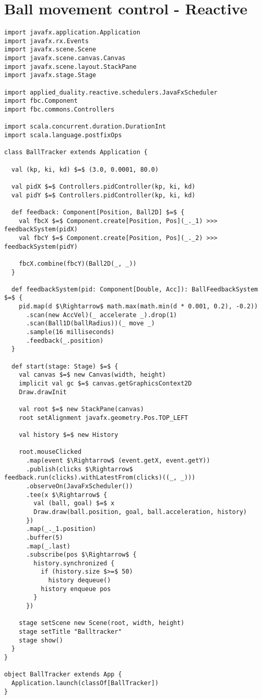 \chapter{Ball movement control - Reactive}
\label{app:ball-movement-reactive}

\begin{lstlisting}[style=ScalaStyle, caption={Ball movement control}, label={lst:ball-full-app-reactive}]
import javafx.application.Application
import javafx.rx.Events
import javafx.scene.Scene
import javafx.scene.canvas.Canvas
import javafx.scene.layout.StackPane
import javafx.stage.Stage

import applied_duality.reactive.schedulers.JavaFxScheduler
import fbc.Component
import fbc.commons.Controllers

import scala.concurrent.duration.DurationInt
import scala.language.postfixOps

class BallTracker extends Application {

  val (kp, ki, kd) $=$ (3.0, 0.0001, 80.0)

  val pidX $=$ Controllers.pidController(kp, ki, kd)
  val pidY $=$ Controllers.pidController(kp, ki, kd)

  def feedback: Component[Position, Ball2D] $=$ {
    val fbcX $=$ Component.create[Position, Pos](_._1) >>> feedbackSystem(pidX)
    val fbcY $=$ Component.create[Position, Pos](_._2) >>> feedbackSystem(pidY)

    fbcX.combine(fbcY)(Ball2D(_, _))
  }

  def feedbackSystem(pid: Component[Double, Acc]): BallFeedbackSystem $=$ {
    pid.map(d $\Rightarrow$ math.max(math.min(d * 0.001, 0.2), -0.2))
      .scan(new AccVel)(_ accelerate _).drop(1)
      .scan(Ball1D(ballRadius))(_ move _)
      .sample(16 milliseconds)
      .feedback(_.position)
  }

  def start(stage: Stage) $=$ {
    val canvas $=$ new Canvas(width, height)
    implicit val gc $=$ canvas.getGraphicsContext2D
    Draw.drawInit

    val root $=$ new StackPane(canvas)
    root setAlignment javafx.geometry.Pos.TOP_LEFT

    val history $=$ new History

    root.mouseClicked
      .map(event $\Rightarrow$ (event.getX, event.getY))
      .publish(clicks $\Rightarrow$ feedback.run(clicks).withLatestFrom(clicks)((_, _)))
      .observeOn(JavaFxScheduler())
      .tee(x $\Rightarrow$ {
        val (ball, goal) $=$ x
        Draw.draw(ball.position, goal, ball.acceleration, history)
      })
      .map(_._1.position)
      .buffer(5)
      .map(_.last)
      .subscribe(pos $\Rightarrow$ {
        history.synchronized {
          if (history.size $>=$ 50)
            history dequeue()
          history enqueue pos
        }
      })

    stage setScene new Scene(root, width, height)
    stage setTitle "Balltracker"
    stage show()
  }
}

object BallTracker extends App {
  Application.launch(classOf[BallTracker])
}
\end{lstlisting}

